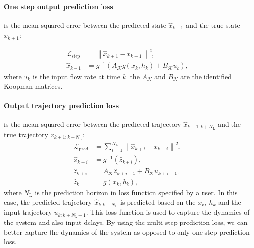 \documentclass[conference]{IEEEtran}
\newcommand{\ui}[2]{#1_{\text{#2}}}  %
\begin{document}
\paragraph*{One step output prediction loss}
is the mean squared error between the predicted state \(\hat{x}_{k+1}\) and the true state \(x_{k+1}\):

\begin{subequations}
    \begin{align}
        \mathcal{L}_{\text{step}} & = \left \|\hat{x}_{k+1} - x_{k+1}\right \|^2,     \\
        \hat{x}_{k+1}             & = g^{-1}(A_\mathcal{K}g(x_k,h_k) + B_\mathcal{K}u_k),
    \end{align}
\end{subequations}
where \(u_k\) is the input flow rate at time \(k\), the \(A_\mathcal{K}\) and \(B_\mathcal{K}\) are the identified Koopman matrices.

\paragraph*{Output trajectory prediction loss}\label{par:methodology:output_loss}
is the mean squared error between the predicted trajectory \(\hat{x}_{k+1:k+\ui{N}{L}}\) and the true trajectory \(x_{k+1:k+\ui{N}{L}}\):
\begin{subequations}
    \begin{align}
        \mathcal{L}_{\text{pred}} & = \sum_{i=1}^{\ui{N}{L}}\left \|\hat{x}_{k+i} - x_{k+i}\right \|^2,            \\
        \hat{x}_{k+i}             & = g^{-1}\left(\hat{z}_{k+i}\right), \\
        \hat{z}_{k+i}             & = A_{\mathcal{K}}\hat{z}_{k+i-1}+B_{\mathcal{K}}u_{k+i-1},          \\
        \hat{z}_{k}               & = g(x_{k},h_k),
    \end{align}
\end{subequations}
where \(\ui{N}{L}\) is the prediction horizon in loss function specified by a user. In this case, the predicted trajectory \(\hat{x}_{k:k+\ui{N}{L}}\) is predicted based on the \(x_k,~h_k\) and the input trajectory \(u_{k:k+\ui{N}{L}-1}\). This loss function is used to capture the dynamics of the system and also input delays. By using the multi-step prediction loss, we can better capture the dynamics of the system as opposed to only one-step prediction loss.
\end{document}
